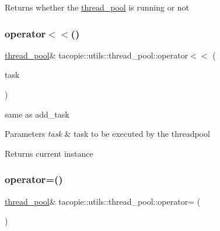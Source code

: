 \begin{DoxyReturn}{Returns}
whether the \hyperlink{classtacopie_1_1utils_1_1thread__pool}{thread\+\_\+pool} is running or not 
\end{DoxyReturn}
\mbox{\label{classtacopie_1_1utils_1_1thread__pool_afb7befd9fa5f1fbd44423fddc8cbc5d3}} 
\subsubsection{\texorpdfstring{operator$<$$<$()}{operator<<()}}
{\footnotesize\ttfamily \hyperlink{classtacopie_1_1utils_1_1thread__pool}{thread\+\_\+pool}\& tacopie\+::utils\+::thread\+\_\+pool\+::operator$<$$<$ (\begin{DoxyParamCaption}\item[{const \hyperlink{classtacopie_1_1utils_1_1thread__pool_a8ae8886fdeaa8e5c0abad12626a47296}{task\+\_\+t} \&}]{task }\end{DoxyParamCaption})}

same as add\+\_\+task


\begin{DoxyParams}{Parameters}
{\em task} & task to be executed by the threadpool \\
\hline
\end{DoxyParams}
\begin{DoxyReturn}{Returns}
current instance 
\end{DoxyReturn}
\mbox{\label{classtacopie_1_1utils_1_1thread__pool_aa0077461da4da6ba3f4dcac029351234}} 
\subsubsection{\texorpdfstring{operator=()}{operator=()}}
{\footnotesize\ttfamily \hyperlink{classtacopie_1_1utils_1_1thread__pool}{thread\+\_\+pool}\& tacopie\+::utils\+::thread\+\_\+pool\+::operator= (\begin{DoxyParamCaption}\item[{const \hyperlink{classtacopie_1_1utils_1_1thread__pool}{thread\+\_\+pool} \&}]{ }\end{DoxyParamCaption})\hspace{0.3cm}{\ttfamily [delete]}}



